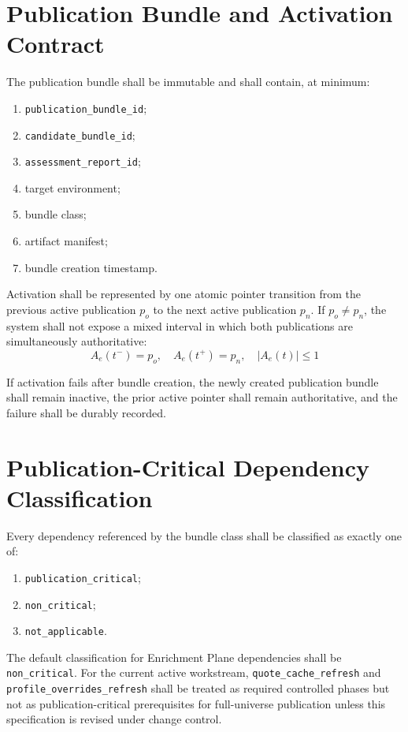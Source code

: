\documentclass[11pt]{report}
\begin{document}
\section{Publication Bundle and Activation Contract}
The publication bundle shall be immutable and shall contain, at minimum:
\begin{enumerate}[leftmargin=1.2cm]
    \item \texttt{publication\_bundle\_id};
    \item \texttt{candidate\_bundle\_id};
    \item \texttt{assessment\_report\_id};
    \item target environment;
    \item bundle class;
    \item artifact manifest;
    \item bundle creation timestamp.
\end{enumerate}

Activation shall be represented by one atomic pointer transition from the previous active publication \(p_o\) to the next active publication \(p_n\). If \(p_o \neq p_n\), the system shall not expose a mixed interval in which both publications are simultaneously authoritative:
\[
A_e(t^-) = p_o,\quad A_e(t^+) = p_n,\quad \left|A_e(t)\right| \le 1
\]

If activation fails after bundle creation, the newly created publication bundle shall remain inactive, the prior active pointer shall remain authoritative, and the failure shall be durably recorded.

\section{Publication-Critical Dependency Classification}
Every dependency referenced by the bundle class shall be classified as exactly one of:
\begin{enumerate}[leftmargin=1.2cm]
    \item \texttt{publication\_critical};
    \item \texttt{non\_critical};
    \item \texttt{not\_applicable}.
\end{enumerate}

The default classification for Enrichment Plane dependencies shall be \texttt{non\_critical}. For the current active workstream, \texttt{quote\_cache\_refresh} and \texttt{profile\_overrides\_refresh} shall be treated as required controlled phases but not as publication-critical prerequisites for full-universe publication unless this specification is revised under change control.
\end{document}
